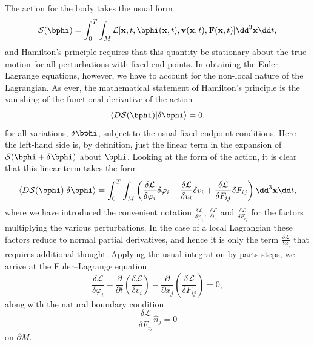 The action for the body takes the usual form
\begin{equation}
\mathcal{S}(\bphi)=\int_{0}^{T}\int_{M}\mathcal{L}[\mathbf{x},t,\bphi
(\mathbf{x},t),\mathbf{v}(\mathbf{x},t),\mathbf{F}(\mathbf{x},t)]\dd^{3}\mathbf{x}\dd t,
\label{eq:21}
\end{equation}
and Hamilton's principle requires that this quantity be stationary about the true motion for all 
perturbations with fixed end points. In obtaining the Euler--Lagrange equations, however, we have to account 
for the non-local nature of the Lagrangian. As ever, the mathematical statement of Hamilton's principle is 
the vanishing of the functional derivative of the action
\begin{equation}
\langle D\mathcal{S}(\bphi)|\delta\bphi\rangle=0,
\label{eq:22}
\end{equation}
for all variations, $\delta\bphi$, subject to the usual fixed-endpoint conditions. Here the 
left-hand side is, by definition, just the linear term in the expansion of $\mathcal{S}(\bphi+
\delta\bphi)$ about $\bphi$. Looking at the form of the action, it is clear that this 
linear term takes the form
\begin{equation}
\langle D\mathcal{S}(\bphi)|\delta\bphi\rangle=\int_{0}^{T}\int_{M}
\left(\frac{\delta\mathcal{L}}{\delta\varphi_{i}}\delta\varphi_{i}+\frac{\delta\mathcal{L}}{\delta v_{i}}
\delta v_{i}+\frac{\delta\mathcal{L}}{\delta F_{ij}}\delta F_{ij}\right)\dd^{3}\mathbf{x}\dd t,
\label{eq:23}
\end{equation}
where we have introduced the convenient notation $\frac{\delta\mathcal{L}}{\delta\varphi_{i}}$, 
$\frac{\delta\mathcal{L}}{\delta v_{i}}$ and $\frac{\delta\mathcal{L}}{\delta F_{ij}}$ for the factors 
multiplying the various perturbations. In the case of a local Lagrangian these factors reduce to normal 
partial derivatives, and hence it is only the term $\frac{\delta\mathcal{L}}{\delta\varphi_{i}}$ that requires 
additional thought. Applying the usual integration by parts steps, we arrive at the Euler--Lagrange equation
\begin{equation}
\frac{\delta\mathcal{L}}{\delta\varphi_{i}}-\frac{\partial}{\partial t}\left(\frac{\delta\mathcal{L}}
{\delta v_{i}}\right)-\frac{\partial}{\partial x_{j}}\left(\frac{\delta\mathcal{L}}{\delta F_{ij}}\right)=0,
\label{eq:24}
\end{equation}
along with the natural boundary condition
\begin{equation}
\frac{\delta\mathcal{L}}{\delta F_{ij}}\hat{n}_{j}=0
\label{eq:25}
\end{equation}
on $\partial M$. 

